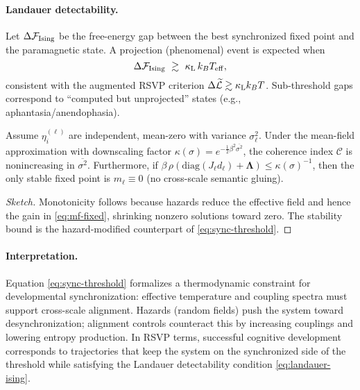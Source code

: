 \documentclass[a4paper,11pt]{article}
\begin{document}
\paragraph{Landauer detectability.}
Let $\Delta \mathcal{F}_{\rm Ising}$ be the free-energy gap between the best
synchronized fixed point and the paramagnetic state. A projection (phenomenal)
event is expected when
\begin{equation}
\label{eq:landauer-ising}
\Delta \mathcal{F}_{\rm Ising} \ \gtrsim\ \kappa_{\rm L}\,k_B T_{\rm eff},
\end{equation}
consistent with the augmented RSVP criterion
$\Delta \widetilde{\mathcal{L}}\gtrsim \kappa_{\rm L} k_B T$.
Sub-threshold gaps correspond to ``computed but unprojected'' states (e.g.,
aphantasia/anendophasia).

\begin{proposition}
\label{prop:hazard-coherence}
Assume $\eta_i^{(\ell)}$ are independent, mean-zero with variance $\sigma_\ell^2$.
Under the mean-field approximation with downscaling factor
$\kappa(\sigma)=e^{-\frac{1}{2}\beta^2 \overline{\sigma^2}}$, the coherence
index $\mathcal{C}$ is nonincreasing in $\overline{\sigma^2}$. Furthermore, if
\(
\beta\,\rho(\mathrm{diag}(J_\ell d_\ell)+\mathbf{\Lambda})\le
\kappa(\sigma)^{-1}
\),
then the only stable fixed point is $m_\ell\equiv 0$ (no cross-scale semantic
gluing).
\end{proposition}

\begin{proof}[Sketch]
Monotonicity follows because hazards reduce the effective field and hence the
gain in \eqref{eq:mf-fixed}, shrinking nonzero solutions toward zero. The
stability bound is the hazard-modified counterpart of
\eqref{eq:sync-threshold}.
\end{proof}

\paragraph{Interpretation.}
Equation \eqref{eq:sync-threshold} formalizes a thermodynamic constraint for
developmental synchronization: effective temperature and coupling spectra must
support cross-scale alignment. Hazards (random fields) push the system toward
desynchronization; alignment controls counteract this by increasing couplings
and lowering entropy production. In RSVP terms, successful cognitive development
corresponds to trajectories that keep the system on the synchronized side of
the threshold while satisfying the Landauer detectability condition
\eqref{eq:landauer-ising}.
\end{document}

